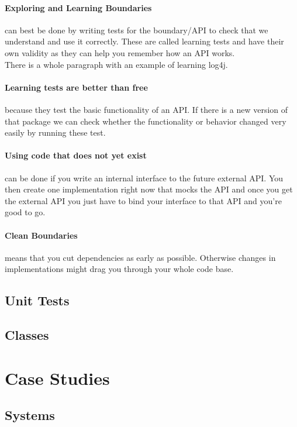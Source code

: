 \documentclass[a4paper, twocolumn]{article}
\begin{document}
\paragraph{Exploring and Learning Boundaries} can best be done by writing tests for the boundary/API to check that we understand and use it correctly. These are called learning tests and have their own validity as they can help you remember how an API works.\\
There is a whole paragraph with an example of learning log4j.
\paragraph{Learning tests are better than free} because they test the basic functionality of an API. If there is a new version of that package we can check whether the functionality or behavior changed very easily by running these test.
\paragraph{Using code that does not yet exist} can be done if you write an internal interface to the future external API. You then create one implementation right now that mocks the API and once you get the external API you just have to bind your interface to that API and you're good to go.
\paragraph{Clean Boundaries} means that you cut dependencies as early as possible. Otherwise changes in implementations might drag you through your whole code base.

\subsection{Unit Tests}

\subsection{Classes}


\section{Case Studies}

\subsection{Systems}
\end{document}
